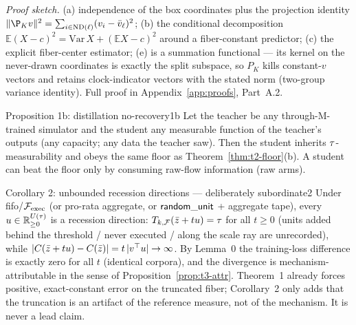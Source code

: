 
\emph{Proof sketch.} (a) independence of the box coordinates plus the
projection identity $\|\P_K v\|^2 = \sum_{i \in \mathrm{ND}(\ell)}
(v_i - \bar v_\ell)^2$; (b) the conditional decomposition
$\mathbb{E}(X - c)^2 = \mathrm{Var}\,X + (\mathbb{E}X - c)^2$ around a
fiber-constant predictor; (c) the explicit fiber-center estimator; (e)
 is a summation functional --- its kernel on the
never-drawn coordinates is exactly the split subspace, so $P_K$ kills
constant-$v$ vectors and retains clock-indicator vectors with the stated
norm (two-group variance identity). Full proof in
Appendix~\ref{app:proofs}, Part~A.2.

\begin{preregthm}{Proposition 1b: distillation no-recovery}{1b}
\label{prop:t2-distill}
Let the teacher be any through-M-trained simulator and the student any
measurable function of the teacher's outputs (any capacity; any data the
teacher saw). Then the student inherits $\tau$-measurability and obeys the
same floor as Theorem~\ref{thm:t2-floor}(b). A student can beat the floor
only by consuming raw-flow information (raw arms).
\end{preregthm}


\begin{preregthm}{Corollary 2: unbounded recession directions --- deliberately
subordinate}{2}
\label{cor:t2-recession}
Under fifo/$\mathcal{F}_{\mathrm{exec}}$ (or pro-rata aggregate, or $\mathsf{random\_unit}$ + aggregate tape),
every $u \in \mathbb{R}_{\ge 0}^{U(\tau)}$ is a recession direction:
$T_{k,\mathcal{F}}(\bar{z} + t u) = \tau$ for all $t \ge 0$ (units added
behind the threshold / never executed / along the scale ray are unrecorded),
while $|C(\bar{z} + t u) - C(\bar{z})| =
t\,|v^{\top}u| \to \infty$. By Lemma~0 the training-loss difference is
exactly zero for all $t$ (identical corpora), and the divergence is
mechanism-attributable in the sense of Proposition~\ref{prop:t3-attr}.
Theorem~1 already forces positive, exact-constant error on the truncated
fiber; Corollary~2 only adds that the truncation is an artifact of the
reference measure, not of the mechanism. It is never a lead claim.
\end{preregthm}



